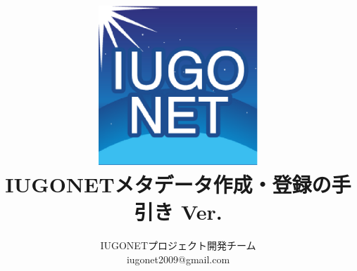 \documentclass[a4j]{jreport}
\title{\includegraphics[width=6cm]{images/eclipse256.eps}\\IUGONETメタデータ作成・登録の手引き Ver.\thedocversion}
\author{IUGONETプロジェクト開発チーム\\iugonet2009@gmail.com}
\begin{document}
\maketitle
\tableofcontents

\def\currentschema{iugonet-1\_0\_4.xsd}







\appendix


\printindex
\end{document}
